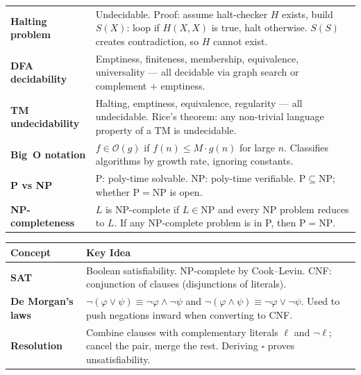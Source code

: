 \documentclass[11pt, a4paper]{article}
\theoremstyle{definition}
\theoremstyle{remark}
\begin{document}
\begin{center}
\begin{tabular}{>{\bfseries}p{4cm} p{9.5cm}}
  Halting problem &
    Undecidable.  Proof: assume halt-checker $H$ exists, build $S(X)$: loop if $H(X,X)$
    is true, halt otherwise.  $S(S)$ creates contradiction, so $H$ cannot exist. \\
  DFA decidability &
    Emptiness, finiteness, membership, equivalence, universality --- all decidable
    via graph search or complement $+$ emptiness. \\
  TM undecidability &
    Halting, emptiness, equivalence, regularity --- all undecidable.  Rice's theorem:
    any non-trivial language property of a TM is undecidable. \\
  Big~O notation &
    $f\in\mathcal{O}(g)$ if $f(n)\leq M\cdot g(n)$ for large $n$.
    Classifies algorithms by growth rate, ignoring constants. \\
  P vs NP &
    $\mathrm{P}$: poly-time solvable.  $\mathrm{NP}$: poly-time verifiable.
    $\mathrm{P}\subseteq\mathrm{NP}$; whether $\mathrm{P}=\mathrm{NP}$ is open. \\
  NP-completeness &
    $L$ is NP-complete if $L\in\mathrm{NP}$ and every NP problem reduces to $L$.
    If any NP-complete problem is in P, then $\mathrm{P}=\mathrm{NP}$. \\
  \bottomrule
\end{tabular}
\end{center}

\newpage

\begin{center}
\renewcommand{\arraystretch}{1.4}
\begin{tabular}{>{\bfseries}p{4cm} p{9.5cm}}
  \toprule
  Concept & Key Idea \\
  \midrule
  SAT &
    Boolean satisfiability.  NP-complete by Cook--Levin.
    CNF: conjunction of clauses (disjunctions of literals). \\
  De Morgan's laws &
    $\lnot(\varphi\lor\psi)\equiv\lnot\varphi\land\lnot\psi$ and
    $\lnot(\varphi\land\psi)\equiv\lnot\varphi\lor\lnot\psi$.
    Used to push negations inward when converting to CNF. \\
  Resolution &
    Combine clauses with complementary literals $\ell$ and $\lnot\ell$; cancel the pair,
    merge the rest.  Deriving $\square$ proves unsatisfiability. \\
  \bottomrule
\end{tabular}
\end{center}

%
%
\end{document}
